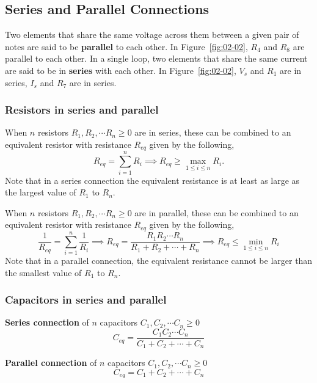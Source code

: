 \subsection{Series and Parallel Connections}
Two elements that share the same voltage across them between a given pair of notes are said to be \textbf{parallel} to each other. In Figure~\ref{fig:02-02}, $R_4$ and $R_8$ are parallel to each other. In a single loop, two elements that share the same current are said to be in \textbf{series} with each other. In Figure~\ref{fig:02-02}, $V_s$ and $R_1$ are in series, $I_s$ and $R_7$ are in series.

\subsubsection{Resistors in series and parallel}
When $n$ resistors $R_1, R_2, \cdots R_n \geq 0$ are in series, these can be combined to an equivalent resistor with resistance $R_{eq}$ given by the following,
\begin{equation}
    R_{eq} = \sum_{i=1}^{n} R_i \implies R_{eq} \geq \max_{1 \leq i \leq n} R_i.
    \label{eq:02-13}
\end{equation}
Note that in a series connection the equivalent resistance is at least as large as the largest value of $R_1$ to $R_n$.

When $n$ resistors $R_1, R_2, \cdots R_n \geq 0$ are in parallel, these can be combined to an equivalent resistor with resistance $R_{eq}$ given by the following,
\begin{equation}
    \frac{1}{R_{eq}} = \sum_{i=1}^{n} \frac{1}{R_i} \implies R_{eq} = \frac{R_1R_2\cdots R_n}{R_1 + R_2 + \cdots + R_n} \implies R_{eq} \leq \min_{1 \leq i \leq n} R_i
    \label{eq:02-14}
\end{equation}
Note that in a parallel connection, the equivalent resistance cannot be larger than the smallest value of $R_1$ to $R_n$.

\subsubsection{Capacitors in series and parallel}
\noindent\textbf{Series connection} of $n$ capacitors $C_1, C_2, \cdots C_n \geq 0$
\begin{equation}
    C_{eq} = \frac{C_1C_2\cdots C_n}{C_1 + C_2 + \cdots + C_n}
    \label{eq:02-15}
\end{equation}

\noindent\textbf{Parallel connection} of $n$ capacitors $C_1, C_2, \cdots C_n \geq 0$
\begin{equation}
    C_{eq} = C_1 + C_2 + \cdots + C_n
    \label{eq:02-16}
\end{equation}

